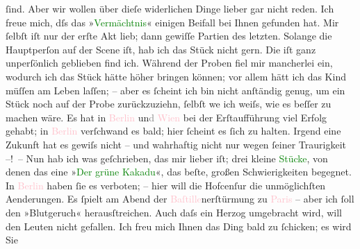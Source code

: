                    ſind. Aber wir wollen über dieſe widerlichen Dinge lieber gar nicht reden.\pend
           \pstart
           Ich freue mich, dſs das »\textcolor{green}{Vermächtnis}{}\ledrightnote{\textcolor{green}{Das Vermächtnis. Schauspiel in drei Akten}}« einigen
                    Beifall bei Ihnen gefunden hat. Mir ſelbſt iſt nur der erſte Akt lieb; dann
                    gewiſſe Partien des letzten. Solange die Hauptperſon auf der Scene iſt, hab ich
                    das Stück nicht gern. Die iſt ganz unperſönlich geblieben find ich. Während der
                    Proben fiel mir mancherlei ein, wodurch ich das Stück hätte höher bringen
                    können; vor allem hätt ich das Kind {\pb}müſſen
                    am Leben laſſen; – aber es ſcheint ich bin nicht anſtändig genug, um ein Stück
                    noch auf der Probe zurückzuziehn, ſelbſt we{\geminationn} ich
                    weiſs, wie es beſſer zu machen wäre. Es hat in \textcolor{pink}{Berlin}{}\ledrightnote{\textcolor{pink}{Berlin}} un\textcolor{gray}{d}{ }\textcolor{pink}{Wien}{}\ledrightnote{\textcolor{pink}{Wien}} bei der Erſtaufführung viel Erfolg gehabt;
                    in \textcolor{pink}{Berlin}{}\ledrightnote{\textcolor{pink}{Berlin}} verſchwand es bald; hier ſcheint es
                    ſich zu halten. Irgend eine Zukunft hat es gewiſs nicht – und wahrhaftig nicht
                    nur wegen ſeiner Traurigkeit –! – Nun hab ich was geſchrieben, das mir lieber
                    iſt; drei kleine \textcolor{green}{Stücke}{}, von denen das {\pb}eine »\textcolor{green}{Der grüne Kakadu}{}\ledrightnote{\textcolor{green}{Der grüne Kakadu. Groteske in einem Akt}}«, das beſte, großen
                    Schwierigkeiten begegnet. In \textcolor{pink}{Berlin}{}\ledrightnote{\textcolor{pink}{Berlin}} haben ſie
                    es verboten; – hier will die Hofcenſur die unmöglichſten Aenderungen. Es ſpielt
                    am Abend der \textcolor{pink}{Baſtille}{}\ledrightnote{\textcolor{pink}{Bastille}}nerſtürmung zu \textcolor{pink}{Paris}{}\ledrightnote{\textcolor{pink}{Paris}} – aber ich ſoll den »Blutgeruch«
                    herausſtreichen. Auch daſs ein Herzog umgebracht wird, will den Leuten nicht
                    gefallen. Ich freu mich Ihnen das Ding bald zu ſchicken; es wird Sie
